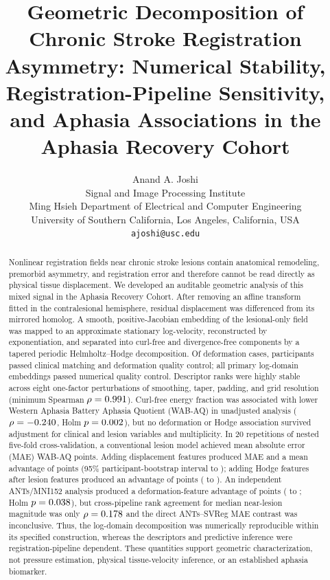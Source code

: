 \documentclass[11pt]{article}
\title{Geometric Decomposition of Chronic Stroke Registration Asymmetry:
Numerical Stability, Registration-Pipeline Sensitivity, and Aphasia Associations in the Aphasia
Recovery Cohort}
\author{Anand A. Joshi\\
Signal and Image Processing Institute\\
Ming Hsieh Department of Electrical and Computer Engineering\\
University of Southern California, Los Angeles, California, USA\\
\texttt{ajoshi@usc.edu}}
\date{}
\begin{document}
\maketitle
\linenumbers

\begin{abstract}
Nonlinear registration fields near chronic stroke lesions contain anatomical
remodeling, premorbid asymmetry, and registration error and therefore cannot be
read directly as physical tissue displacement. We developed an auditable
geometric analysis of this mixed signal in the Aphasia Recovery Cohort. After
removing an affine transform fitted in the contralesional hemisphere, residual
displacement was differenced from its mirrored homolog. A smooth,
positive-Jacobian embedding of the lesional-only field was mapped to an
approximate stationary log-velocity, reconstructed by exponentiation, and
separated into curl-free and divergence-free components by a tapered periodic
Helmholtz--Hodge decomposition. Of \ManifestN{} deformation cases,
\AnalysisN{} participants passed clinical matching and deformation quality
control; all \HodgeQCPassN{} primary log-domain embeddings passed numerical
quality control. Descriptor ranks were highly stable across eight one-factor
perturbations of smoothing, taper, padding, and grid resolution (minimum
Spearman $\rho=0.991$). Curl-free energy fraction
was associated with lower Western Aphasia Battery Aphasia Quotient (WAB-AQ) in
unadjusted analysis ($\rho=-0.240$, Holm $p=0.002$), but no
deformation or Hodge association survived adjustment for clinical and lesion
variables and multiplicity. In 20 repetitions of nested five-fold
cross-validation, a conventional lesion model achieved mean absolute error
(MAE) \StandardMAE{} WAB-AQ points. Adding displacement features produced MAE
\DeformationMAE{} and a mean advantage of \DeformationAdvantage{} points (95\%
participant-bootstrap interval \DeformationCILow{} to
\DeformationCIHigh{}); adding Hodge features after lesion features produced an
advantage of \HodgeAdvantage{} points (\HodgeCILow{} to \HodgeCIHigh{}). An
independent ANTs/MNI152 analysis produced a deformation-feature advantage of
\AntsDeformationAdvantage{} points
(\AntsDeformationCILow{} to \AntsDeformationCIHigh{}; Holm
$p=0.038$), but cross-pipeline rank agreement for median
near-lesion magnitude was only $\rho=0.178$ and the direct
ANTs--SVReg MAE contrast was inconclusive. Thus, the log-domain decomposition
was numerically reproducible within its specified construction, whereas the
descriptors and predictive inference were registration-pipeline dependent.
These quantities support geometric characterization, not pressure estimation,
physical tissue-velocity inference, or an established aphasia biomarker.
\end{abstract}
\end{document}
